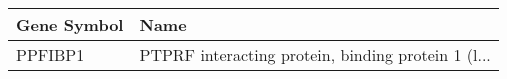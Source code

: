 \begin{tabular}{ll}
\toprule
Gene Symbol &                                               Name \\
\midrule
    PPFIBP1 & PTPRF interacting protein, binding protein 1 (l... \\
\bottomrule
\end{tabular}
